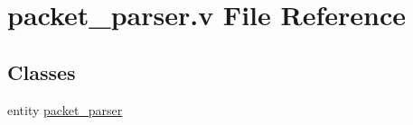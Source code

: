 \hypertarget{packet__parser_8v}{}\section{packet\+\_\+parser.\+v File Reference}
\label{packet__parser_8v}
\subsection*{Classes}
\begin{DoxyCompactItemize}
\item 
entity \mbox{\hyperlink{enumpacket__parser}{packet\+\_\+parser}}
\end{DoxyCompactItemize}
